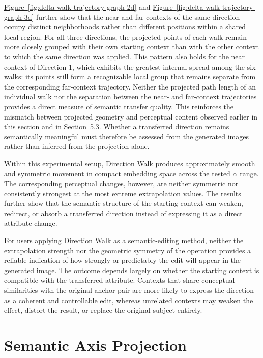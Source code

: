 \hyperref[fig:delta-walk-trajectory-graph-2d]{Figure~\ref*{fig:delta-walk-trajectory-graph-2d}} and \hyperref[fig:delta-walk-trajectory-graph-3d]{Figure~\ref*{fig:delta-walk-trajectory-graph-3d}} further show that the near and far contexts of the same direction occupy distinct neighborhoods rather than different positions within a shared local region. For all three directions, the projected points of each walk remain more closely grouped with their own starting context than with the other context to which the same direction was applied. This pattern also holds for the near context of Direction 1, which exhibits the greatest internal spread among the six walks: its points still form a recognizable local group that remains separate from the corresponding far-context trajectory. Neither the projected path length of an individual walk nor the separation between the near- and far-context trajectories provides a direct measure of semantic transfer quality. This reinforces the mismatch between projected geometry and perceptual content observed earlier in this section and in \hyperref[sec:5.3]{Section~5.3}. Whether a transferred direction remains semantically meaningful must therefore be assessed from the generated images rather than inferred from the projection alone.

Within this experimental setup, Direction Walk produces approximately smooth and symmetric movement in compact embedding space across the tested $\alpha$ range. The corresponding perceptual changes, however, are neither symmetric nor consistently strongest at the most extreme extrapolation values. The results further show that the semantic structure of the starting context can weaken, redirect, or absorb a transferred direction instead of expressing it as a direct attribute change.

For users applying Direction Walk as a semantic-editing method, neither the extrapolation strength nor the geometric symmetry of the operation provides a reliable indication of how strongly or predictably the edit will appear in the generated image. The outcome depends largely on whether the starting context is compatible with the transferred attribute. Contexts that share conceptual similarities with the original anchor pair are more likely to express the direction as a coherent and controllable edit, whereas unrelated contexts may weaken the effect, distort the result, or replace the original subject entirely.

\FloatBarrier
\section{Semantic Axis Projection}\label{sec:5.5}

